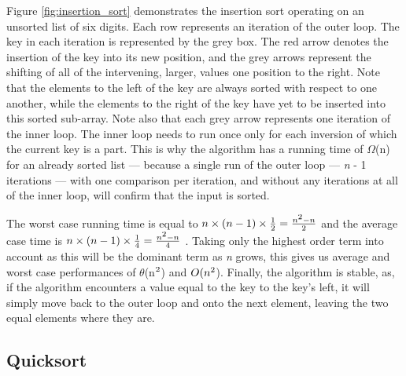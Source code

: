 \documentclass[12pt, a4paper]{article}
\begin{document}
Figure \ref{fig:insertion_sort} demonstrates the insertion sort operating on an unsorted list of six digits. Each row represents an iteration of the outer loop. The key in each iteration is represented by the grey box. The red arrow denotes the insertion of the key into its new position, and the grey arrows represent the shifting of all of the intervening, larger, values one position to the right. Note that the elements to the left of the key are always sorted with respect to one another, while the elements to the right of the key have yet to be inserted into this sorted sub-array. Note also that each grey arrow represents one iteration of the inner loop. The inner loop needs to run once only for each inversion of which the current key is a part. This is why the algorithm has a running time of $\Omega$(n) for an already sorted list — because a single run of the outer loop — \emph{n} - 1 iterations — with one comparison per iteration, and without any iterations at all of the inner loop, will confirm that the input is sorted.

The worst case running time is equal to $n \times (n - 1) \times \frac{1}{2} = \frac{n\textsuperscript{2} - n}{2}$ and the average case time is  $n \times (n - 1) \times \frac{1}{4} = \frac{n\textsuperscript{2} - n}{4}$ \autocite{woltmann20:insertion}. Taking only the highest order term into account as this will be the dominant term as \emph{n} grows, this gives us average and worst case performances of $\theta$(n$\textsuperscript{2}$) and $O(n\textsuperscript{2}$). Finally, the algorithm is stable, as, if the algorithm encounters a value equal to the key to the key's left, it will simply move back to the outer loop and onto the next element, leaving the two equal elements where they are.

\subsection{Quicksort}
\end{document}
